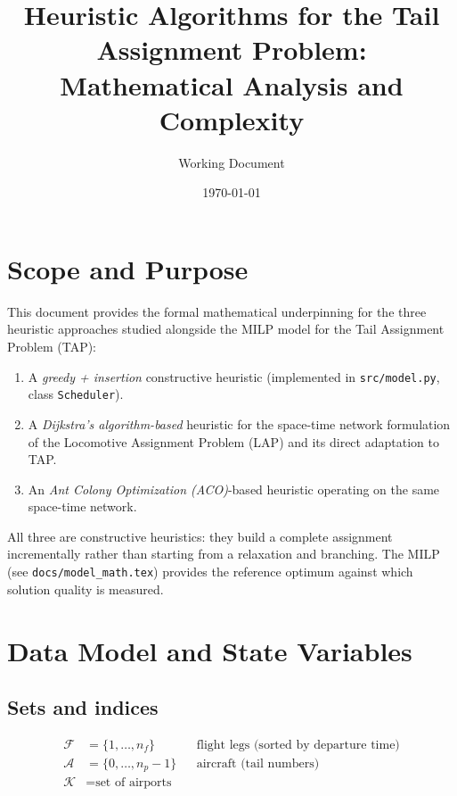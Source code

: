 \documentclass[11pt, a4paper]{article}
\title{Heuristic Algorithms for the Tail Assignment Problem:\\
  Mathematical Analysis and Complexity}
\author{Working Document}
\date{\today}
\theoremstyle{plain}
\theoremstyle{definition}
\theoremstyle{remark}
\newcommand{\F}{\mathcal{F}}
\newcommand{\Ac}{\mathcal{A}}
\newcommand{\K}{\mathcal{K}}
\begin{document}
\maketitle
\tableofcontents
\clearpage

\section{Scope and Purpose}

This document provides the formal mathematical underpinning for the three
heuristic approaches studied alongside the MILP model for the Tail Assignment
Problem (TAP):
\begin{enumerate}[label=(\arabic*)]
  \item A \emph{greedy + insertion} constructive heuristic (implemented in
    \texttt{src/model.py}, class \texttt{Scheduler}).
  \item A \emph{Dijkstra's algorithm-based} heuristic for the space-time
    network formulation of the Locomotive Assignment Problem (LAP) and its
    direct adaptation to TAP.
  \item An \emph{Ant Colony Optimization (ACO)}-based heuristic operating
    on the same space-time network.
\end{enumerate}

All three are constructive heuristics: they build a complete assignment
incrementally rather than starting from a relaxation and branching.  The MILP
(see \texttt{docs/model\_math.tex}) provides the reference optimum against
which solution quality is measured.

\section{Data Model and State Variables}

\subsection{Sets and indices}

\begin{align*}
  \F &= \{1,\dots,n_f\}  &&\text{flight legs (sorted by departure time)} \\
  \Ac &= \{0,\dots,n_p-1\} &&\text{aircraft (tail numbers)} \\
  \K   &= \text{set of airports}
\end{align*}
\end{document}
